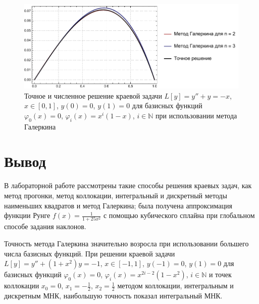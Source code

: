 \documentclass[
11pt,
master, %
subf, %
href, %
colorlinks=true, %
times, %
]{disser}
\begin{document}
\begin{figure}[h]
  \centering
  \includegraphics[width=0.8\linewidth]{plS4.pdf}
  \caption{Точное и численное решение краевой задачи $L[y] = y'' + y = -x$, $x \in [0,1]$, $y(0) = 0$, $y(1) = 0$ для базисных функций $\varphi_0(x) = 0$, $\varphi_i(x) = x^i (1-x)$, $i\in \mathbb{N}$ при использовании метода Галеркина}\label{ris:4}
\end{figure}


\newpage
\section{Вывод}
В лабораторной работе рассмотрены такие способы решения краевых задач, как метод прогонки, метод коллокации, интегральный и дискретный методы наименьших квадратов и метод Галеркина; была получена аппроксимация функции Рунге $f(x) = \frac{1}{1 + 25 x^2}$ с помощью кубического сплайна при глобальном способе задания наклонов.

Точность метода Галеркина значительно возросла при использовании большего числа базисных функций. При решении краевой задачи $L[y] = y'' + \left(1+x^2\right)y = -1$, $x\in [-1,1]$, $y(-1) = 0$, $y(1) = 0$ для базисных функций $\varphi_0(x) = 0$, $\varphi_i (x) = x^{2i-2}\left(1 - x^2\right)$, $i\in \mathbb{N}$ и точек коллокации $x_0 = 0$, $x_1 = -\frac{1}{2}$, $x_2 = \frac{1}{2}$ методом коллокации, интегральным и дискретным МНК, наибольшую точность показал интегральный МНК.
\end{document}
